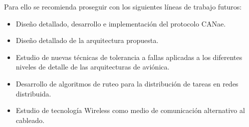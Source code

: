 Para ello se recomienda proseguir con los siguientes líneas de trabajo futuros:
\begin{itemize}
\item Diseño detallado, desarrollo e implementación del protocolo CANae.
\item Diseño detallado de la arquitectura propuesta.
\item Estudio de nuevas técnicas de tolerancia a fallas aplicadas a los diferentes niveles
de detalle de las arquitecturas de aviónica.
\item Desarrollo de algoritmos de ruteo para la distribución de tareas en redes distribuida.
\item Estudio de tecnología Wireless como medio de comunicación alternativo al cableado.
\end{itemize}

